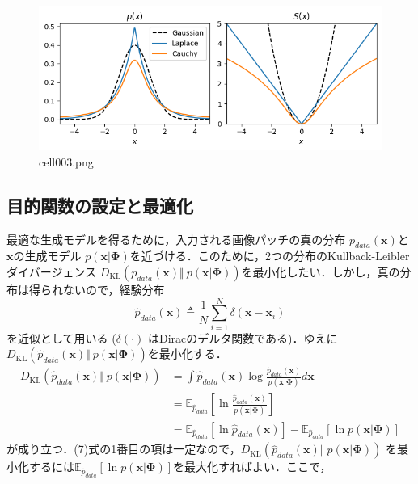 \begin{figure}[ht]
	\centering
	\includegraphics[scale=0.8, max width=\linewidth]{./fig/energy-based-model/sparse-coding/cell003.png}
	\caption{cell003.png}
	\label{cell003.png}
\end{figure}
\subsection{目的関数の設定と最適化}
最適な生成モデルを得るために，入力される画像パッチの真の分布 $p_{data}(\mathbf{x})$と$\mathbf{x}$の生成モデル $p(\mathbf{x}|\mathbf{\Phi})$を近づける．このために，2つの分布のKullback-Leibler ダイバージェンス $D_{\text{KL}}\left(p_{data}(\mathbf{x}) \Vert\ p(\mathbf{x}|\mathbf{\Phi})\right)$を最小化したい．しかし，真の分布は得られないので，経験分布 
\begin{equation}
\hat{p}_{data}(\mathbf{x})\triangleq\frac{1}{N}\sum_{i=1}^N \delta(\mathbf{x}-\mathbf{x}_i)
\end{equation}
を近似として用いる ($\delta(\cdot)$ はDiracのデルタ関数である)．ゆえに$D_{\text{KL}}\left(\hat{p}_{data}(\mathbf{x}) \Vert\ p(\mathbf{x}|\mathbf{\Phi})\right)$を最小化する．
\begin{align}
D_{\text{KL}}\left(\hat{p}_{data}(\mathbf{x}) \Vert\ p(\mathbf{x}|\mathbf{\Phi})\right)&=\int \hat{p}_{data}(\mathbf{x}) \log \frac{\hat{p}_{data}(\mathbf{x})}{p(\mathbf{x}|\mathbf{\Phi})} d\mathbf{x}\\
&=\mathbb{E}_{\hat{p}_{data}} \left[\ln \frac{\hat{p}_{data}(\mathbf{x})}{p(\mathbf{x}|\mathbf{\Phi})}\right]\\
&=\mathbb{E}_{\hat{p}_{data}} \left[\ln \hat{p}_{data}(\mathbf{x})\right]-\mathbb{E}_{\hat{p}_{data}} \left[\ln p(\mathbf{x}|\mathbf{\Phi})\right]
\end{align}
が成り立つ．(7)式の1番目の項は一定なので，$D_{\text{KL}}\left(\hat{p}_{data}(\mathbf{x}) \Vert\ p(\mathbf{x}|\mathbf{\Phi})\right)$ を最小化するには$\mathbb{E}_{\hat{p}_{data}} \left[\ln p(\mathbf{x}|\mathbf{\Phi})\right]$を最大化すればよい．ここで，
